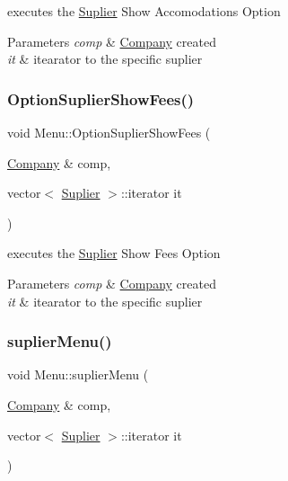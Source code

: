 executes the \hyperlink{class_suplier}{Suplier} Show Accomodations Option 


\begin{DoxyParams}{Parameters}
{\em comp} & \hyperlink{class_company}{Company} created\\
\hline
{\em it} & itearator to the specific suplier \\
\hline
\end{DoxyParams}
\hypertarget{class_menu_aee11e9ba60e367e3f48d73033f413804}{}\label{class_menu_aee11e9ba60e367e3f48d73033f413804} 
\subsubsection{\texorpdfstring{Option\+Suplier\+Show\+Fees()}{OptionSuplierShowFees()}}
{\footnotesize\ttfamily void Menu\+::\+Option\+Suplier\+Show\+Fees (\begin{DoxyParamCaption}\item[{\hyperlink{class_company}{Company} \&}]{comp,  }\item[{vector$<$ \hyperlink{class_suplier}{Suplier} $>$\+::iterator}]{it }\end{DoxyParamCaption})}



executes the \hyperlink{class_suplier}{Suplier} Show Fees Option 


\begin{DoxyParams}{Parameters}
{\em comp} & \hyperlink{class_company}{Company} created\\
\hline
{\em it} & itearator to the specific suplier \\
\hline
\end{DoxyParams}
\hypertarget{class_menu_a5b816b93adda2ccae15ee205855a139c}{}\label{class_menu_a5b816b93adda2ccae15ee205855a139c} 
\subsubsection{\texorpdfstring{suplier\+Menu()}{suplierMenu()}}
{\footnotesize\ttfamily void Menu\+::suplier\+Menu (\begin{DoxyParamCaption}\item[{\hyperlink{class_company}{Company} \&}]{comp,  }\item[{vector$<$ \hyperlink{class_suplier}{Suplier} $>$\+::iterator}]{it }\end{DoxyParamCaption})}



